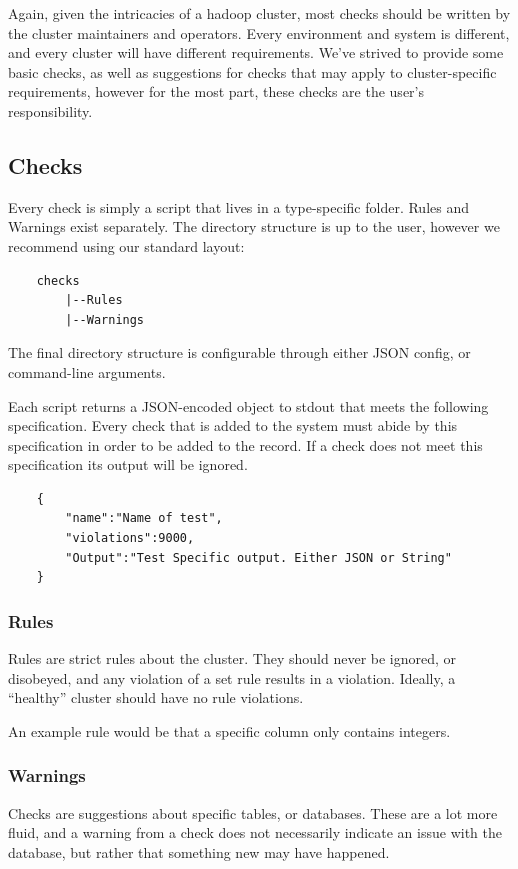 Again, given the intricacies of a hadoop cluster, most checks should be written by the cluster maintainers and
operators. Every environment and system is different, and every cluster will have different requirements. We've strived
to provide some basic checks, as well as suggestions for checks that may apply to cluster-specific requirements, however
for the most part, these checks are the user's responsibility.

    \subsection{Checks}
    Every check is simply a script that lives in a type-specific folder. Rules and Warnings exist separately. The directory
    structure is up to the user, however we recommend using our standard layout:

    \begin{verbatim}
    checks
        |--Rules
        |--Warnings
    \end{verbatim}

    The final directory structure is configurable through either JSON config, or command-line arguments.

    Each script returns a JSON-encoded object to {\ttfamily stdout} that meets the following specification. Every check
    that is added to the system must abide by this specification in order to be added to the record. If a check does
    not meet this specification its output will be ignored.

    \begin{verbatim}
    {
        "name":"Name of test",
        "violations":9000,
        "Output":"Test Specific output. Either JSON or String"
    }
    \end{verbatim}

        \subsubsection{Rules}
        Rules are strict rules about the cluster. They should never be ignored, or disobeyed, and any violation of a set rule
        results in a violation. Ideally, a ``healthy'' cluster should have no rule violations.

        An example rule would be that a specific column only contains integers.

        \subsubsection{Warnings}
        Checks are suggestions about specific tables, or databases. These are a lot more fluid, and a warning from a check does
        not necessarily indicate an issue with the database, but rather that something new may have happened.


